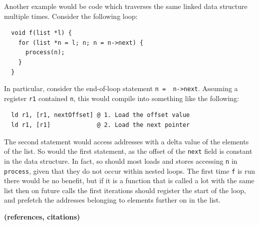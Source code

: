 Another example would be code which traverses the same linked data
structure multiple times. Consider the following loop:

\begin{lstlisting}
  void f(list *l) {
    for (list *n = l; n; n = n->next) {
      process(n);
    }
  }
\end{lstlisting}

In particular, consider the end-of-loop statement {\lstinline|n =  n->next|}. 
Assuming a register {\lstinline|r1|} contained {\lstinline|n|}, this
would compile into something like the following:
\begin{lstlisting}
  ld r1, [r1, nextOffset] @ 1. Load the offset value
  ld r1, [r1]             @ 2. Load the next pointer
\end{lstlisting}
The second statement would access addresses with a delta value of the
elements of the list. So would the first statement, as the offset of
the {\lstinline|next|} field is constant in the data structure. In
fact, so should most loads and stores accessing {\lstinline|n|} in
{\lstinline|process|}, given that they do not occur within nested
loops. The first time {\lstinline|f|} is run there would be no
benefit, but if it is a function that is called a lot with the same
list then on future calls the first iterations should register the
start of the loop, and prefetch the addresses belonging to elements
further on in the list.

{\bf (references, citations)}
